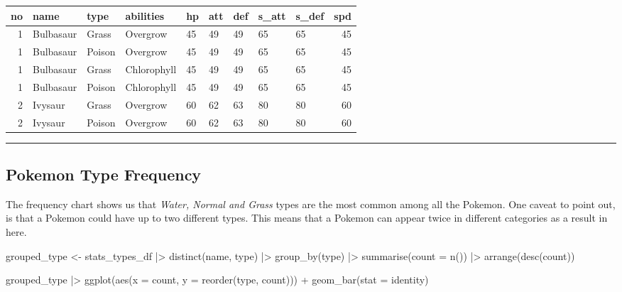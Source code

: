 \documentclass[
]{article}
\newenvironment{Shaded}{\begin{snugshade}}{\end{snugshade}}
\newcommand{\AttributeTok}[1]{\textcolor[rgb]{0.77,0.63,0.00}{#1}}
\newcommand{\FunctionTok}[1]{\textcolor[rgb]{0.00,0.00,0.00}{#1}}
\newcommand{\NormalTok}[1]{#1}
\newcommand{\OtherTok}[1]{\textcolor[rgb]{0.56,0.35,0.01}{#1}}
\newcommand{\SpecialCharTok}[1]{\textcolor[rgb]{0.00,0.00,0.00}{#1}}
\newcommand{\StringTok}[1]{\textcolor[rgb]{0.31,0.60,0.02}{#1}}
\begin{document}
\begin{longtable}[]{@{}rllllllllr@{}}
\toprule()
no & name & type & abilities & hp & att & def & s\_att & s\_def & spd \\
\midrule()
\endhead
1 & Bulbasaur & Grass & Overgrow & 45 & 49 & 49 & 65 & 65 & 45 \\
1 & Bulbasaur & Poison & Overgrow & 45 & 49 & 49 & 65 & 65 & 45 \\
1 & Bulbasaur & Grass & Chlorophyll & 45 & 49 & 49 & 65 & 65 & 45 \\
1 & Bulbasaur & Poison & Chlorophyll & 45 & 49 & 49 & 65 & 65 & 45 \\
2 & Ivysaur & Grass & Overgrow & 60 & 62 & 63 & 80 & 80 & 60 \\
2 & Ivysaur & Poison & Overgrow & 60 & 62 & 63 & 80 & 80 & 60 \\
\bottomrule()
\end{longtable}

\begin{center}\rule{0.5\linewidth}{0.5pt}\end{center}

\hypertarget{pokemon-type-frequency}{%
\subsection{Pokemon Type Frequency}\label{pokemon-type-frequency}}

The frequency chart shows us that \emph{Water, Normal and Grass} types
are the most common among all the Pokemon. One caveat to point out, is
that a Pokemon could have up to two different types. This means that a
Pokemon can appear twice in different categories as a result in here.

\begin{Shaded}
\begin{Highlighting}[]
\NormalTok{grouped\_type }\OtherTok{\textless{}{-}}  
\NormalTok{  stats\_types\_df }\SpecialCharTok{|\textgreater{}} 
  \FunctionTok{distinct}\NormalTok{(name, type) }\SpecialCharTok{|\textgreater{}} 
  \FunctionTok{group\_by}\NormalTok{(type) }\SpecialCharTok{|\textgreater{}} 
  \FunctionTok{summarise}\NormalTok{(}\AttributeTok{count =} \FunctionTok{n}\NormalTok{()) }\SpecialCharTok{|\textgreater{}} 
    \FunctionTok{arrange}\NormalTok{(}\FunctionTok{desc}\NormalTok{(count))}

\NormalTok{grouped\_type }\SpecialCharTok{|\textgreater{}} 
  \FunctionTok{ggplot}\NormalTok{(}\FunctionTok{aes}\NormalTok{(}\AttributeTok{x =}\NormalTok{ count, }\AttributeTok{y =} \FunctionTok{reorder}\NormalTok{(type, count))) }\SpecialCharTok{+}
  \FunctionTok{geom\_bar}\NormalTok{(}\AttributeTok{stat =} \StringTok{\textquotesingle{}identity\textquotesingle{}}\NormalTok{)}
\end{Highlighting}
\end{Shaded}
\end{document}
